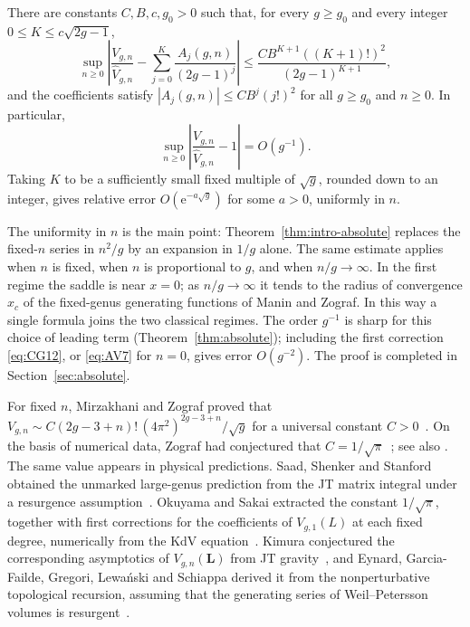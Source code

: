\begin{mainresult}
\begin{theorem}\label{thm:intro-absolute}
There are constants $C,B,c,g_0>0$ such that, for every $g\ge g_0$ and every integer $0\le K\le c\sqrt{2g-1}$,
\[
 \sup_{n\ge0}\left|\frac{V_{g,n}}{\widehat V_{g,n}}
       -\sum_{j=0}^K\frac{A_j(g,n)}{(2g-1)^j}\right|
 \le\frac{CB^{K+1}((K+1)!)^2}{(2g-1)^{K+1}},
\]
and the coefficients satisfy $|A_j(g,n)|\le CB^j(j!)^2$ for all $g\ge g_0$ and $n\ge0$. In particular,
\[
 \sup_{n\ge0}\left|\frac{V_{g,n}}{\widehat V_{g,n}}-1\right|=O(g^{-1}).
\]
Taking $K$ to be a sufficiently small fixed multiple of $\sqrt g$, rounded down to an integer, gives relative error $O(\mathrm{e}^{-a\sqrt g})$ for some $a>0$, uniformly in $n$.
\end{theorem}
\end{mainresult}

The uniformity in $n$ is the main point: Theorem~\ref{thm:intro-absolute} replaces the fixed-$n$ series in $n^2/g$ by an expansion in $1/g$ alone. The same estimate applies when $n$ is fixed, when $n$ is proportional to $g$, and when $n/g\to\infty$. In the first regime the saddle is near $x=0$; as $n/g\to\infty$ it tends to the radius of convergence $x_c$ of the fixed-genus generating functions of Manin and Zograf. In this way a single formula joins the two classical regimes. The order $g^{-1}$ is sharp for this choice of leading term (Theorem~\ref{thm:absolute}); including the first correction \eqref{eq:CG12}, or \eqref{eq:AV7} for $n=0$, gives error $O(g^{-2})$. The proof is completed in Section~\ref{sec:absolute}.

For fixed $n$, Mirzakhani and Zograf proved that $V_{g,n}\sim C(2g-3+n)!\,(4\pi^2)^{2g-3+n}/\sqrt g$ for a universal constant $C>0$~\cite[Theorem~1.2]{MZ}. On the basis of numerical data, Zograf had conjectured that $C=1/\sqrt\pi$~\cite{Zog}; see also \cite[Remark~1.3]{MZ}. The same value appears in physical predictions. Saad, Shenker and Stanford obtained the unmarked large-genus prediction from the JT matrix integral under a resurgence assumption~\cite[Section~5.6]{SSS}. Okuyama and Sakai extracted the constant $1/\sqrt\pi$, together with first corrections for the coefficients of $V_{g,1}(L)$ at each fixed degree, numerically from the KdV equation~\cite[Section~2.4, equation~(89)]{OS}. Kimura conjectured the corresponding asymptotics of $V_{g,n}(\mathbf L)$ from JT gravity~\cite[equation~(28)]{Kim}, and Eynard, Garcia-Failde, Gregori, Lewa\'nski and Schiappa derived it from the nonperturbative topological recursion, assuming that the generating series of Weil--Petersson volumes is resurgent~\cite[Section~6.1, equation~(6.7)]{EGGLS}.


